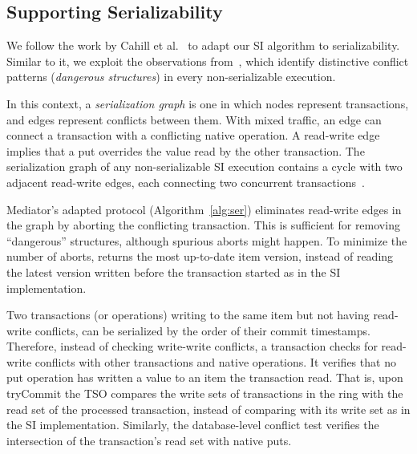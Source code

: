 


\subsection{Supporting Serializability}
\label{sec:ser}

We follow the work by Cahill et al.~\cite{Cahill2008} to adapt our SI algorithm 
to serializability. Similar to it, we exploit the observations from~\cite{FeketeTODS2005}, 
which identify distinctive conflict patterns (\emph{dangerous structures}) in every 
non-serializable execution. 

In this context, a \emph{serialization graph} is one in which nodes represent transactions, and edges represent conflicts between them.
With mixed traffic, an edge can connect a transaction with a conflicting native operation.
A read-write edge implies that a put overrides the value read by the other transaction. 
The serialization graph of any non-serializable 
SI execution contains a cycle with two adjacent read-write edges, each connecting two 
concurrent transactions~\cite{FeketeTODS2005}.

Mediator's adapted protocol (Algorithm~\ref{alg:ser}) eliminates read-write
edges in the graph by aborting the conflicting transaction. %
This is sufficient for removing ``dangerous'' structures, although spurious aborts 
might happen. 
%
To minimize the number of aborts, 
{} returns the most up-to-date item
version, instead of reading the latest version
written before the transaction started as in the SI
implementation.

Two transactions (or operations) writing to the same item but not having 
read-write conflicts, can be serialized by the order of their commit timestamps.
Therefore, instead of checking write-write conflicts, a transaction checks for 
read-write conflicts with other transactions and
native operations.
It verifies that no put operation has written a value to an item the transaction
read.
That is, upon {\sc tryCommit\/} the TSO compares the write sets of
transactions in the ring with the read set of the processed
transaction, instead of comparing with its
write set as in the SI implementation.
Similarly, the database-level conflict test verifies the intersection of the 
transaction's read set with native puts.

